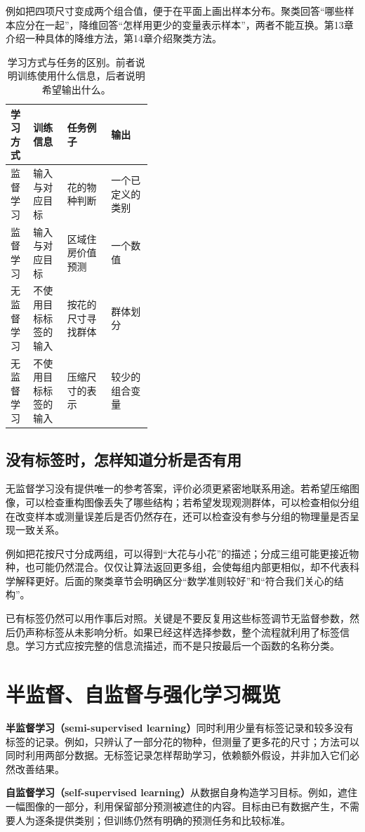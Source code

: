 例如把四项尺寸变成两个组合值，便于在平面上画出样本分布。聚类回答“哪些样本应分在一起”，降维回答“怎样用更少的变量表示样本”，两者不能互换。第13章介绍一种具体的降维方法，第14章介绍聚类方法。

\begin{table}[htbp]\centering\small
\caption{学习方式与任务的区别。前者说明训练使用什么信息，后者说明希望输出什么。}
\begin{tabularx}{\linewidth}{p{0.16\linewidth}p{0.24\linewidth}XX}\toprule
学习方式&训练信息&任务例子&输出\\\midrule
监督学习&输入与对应目标&花的物种判断&一个已定义的类别\\
监督学习&输入与对应目标&区域住房价值预测&一个数值\\
无监督学习&不使用目标标签的输入&按花的尺寸寻找群体&群体划分\\
无监督学习&不使用目标标签的输入&压缩尺寸的表示&较少的组合变量\\\bottomrule
\end{tabularx}\end{table}

\subsection{没有标签时，怎样知道分析是否有用}
无监督学习没有提供唯一的参考答案，评价必须更紧密地联系用途。若希望压缩图像，可以检查重构图像丢失了哪些结构；若希望发现观测群体，可以检查相似分组在改变样本或测量误差后是否仍然存在，还可以检查没有参与分组的物理量是否呈现一致关系。

例如把花按尺寸分成两组，可以得到“大花与小花”的描述；分成三组可能更接近物种，也可能仍然混合。仅仅让算法返回更多组，会使每组内部更相似，却不代表科学解释更好。后面的聚类章节会明确区分“数学准则较好”和“符合我们关心的结构”。

已有标签仍然可以用作事后对照。关键是不要反复用这些标签调节无监督参数，然后仍声称标签从未影响分析。如果已经这样选择参数，整个流程就利用了标签信息。学习方式应按完整的信息流描述，而不是只按最后一个函数的名称分类。

\section{半监督、自监督与强化学习概览}
\textbf{半监督学习（semi-supervised learning）}同时利用少量有标签记录和较多没有标签的记录。例如，只辨认了一部分花的物种，但测量了更多花的尺寸；方法可以同时利用两部分数据。无标签记录怎样帮助学习，依赖额外假设，并非加入它们必然改善结果。

\textbf{自监督学习（self-supervised learning）}从数据自身构造学习目标。例如，遮住一幅图像的一部分，利用保留部分预测被遮住的内容。目标由已有数据产生，不需要人为逐条提供类别；但训练仍然有明确的预测任务和比较标准。

